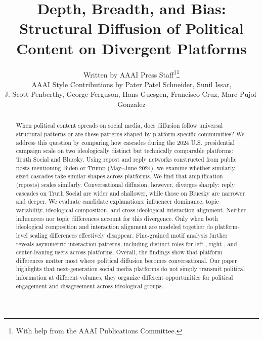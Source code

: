\documentclass[letterpaper]{article} %
\title{Depth, Breadth, and Bias: Structural Diffusion of Political Content on Divergent Platforms}
\author{
    Written by AAAI Press Staff\textsuperscript{\rm 1}\thanks{With help from the AAAI Publications Committee.}\\
    AAAI Style Contributions by Pater Patel Schneider,
    Sunil Issar,\\
    J. Scott Penberthy,
    George Ferguson,
    Hans Guesgen,
    Francisco Cruz\equalcontrib,
    Marc Pujol-Gonzalez\equalcontrib
}
\begin{document}
\maketitle

\begin{abstract}

When political content spreads on social media, does diffusion follow universal structural patterns or are these patterns shaped by platform-specific communities? We address this question by comparing how cascades during the 2024 U.S. presidential campaign scale on two ideologically distinct but technically comparable platforms: Truth Social and Bluesky. Using repost and reply networks constructed from public posts mentioning Biden or Trump (May–June 2024), we examine whether similarly sized cascades take similar shapes across platforms. We find that amplification (reposts) scales similarly. Conversational diffusion, however, diverges sharply: reply cascades on Truth Social are wider and shallower, while those on Bluesky are narrower and deeper. We evaluate candidate explanations: influencer dominance, topic variability, ideological composition, and cross-ideological interaction alignment. Neither influencers nor topic differences account for this divergence. Only when both ideological composition and interaction alignment are modeled together do platform-level scaling differences effectively disappear. 
Fine-grained motif analysis further reveals asymmetric interaction patterns, including distinct roles for left-, right-, and center-leaning users across platforms. Overall, the findings show that platform differences matter most where political diffusion becomes conversational. Our paper highlights that next-generation social media platforms do not simply transmit political information at different volumes; they organize different opportunities for political engagement and disagreement across ideological groups.

\end{abstract}
\end{document}
